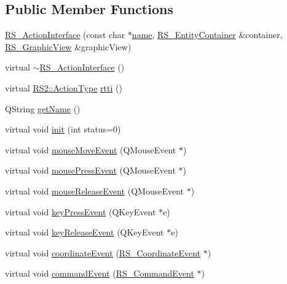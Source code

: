 \subsection*{Public Member Functions}
\begin{DoxyCompactItemize}
\item 
\hyperlink{classRS__ActionInterface_ac6be77152e154e4d39f935c89734a823}{R\-S\-\_\-\-Action\-Interface} (const char $\ast$\hyperlink{classRS__ActionInterface_a1fdccfa2fcee3e1d21e6f79e6987f3df}{name}, \hyperlink{classRS__EntityContainer}{R\-S\-\_\-\-Entity\-Container} \&container, \hyperlink{classRS__GraphicView}{R\-S\-\_\-\-Graphic\-View} \&graphic\-View)
\item 
virtual \hyperlink{classRS__ActionInterface_ab7bbb74cca442b42905fcfd956f8aecb}{$\sim$\-R\-S\-\_\-\-Action\-Interface} ()
\item 
virtual \hyperlink{classRS2_afe3523e0bc41fd637b892321cfc4b9d7}{R\-S2\-::\-Action\-Type} \hyperlink{classRS__ActionInterface_af877a66b5b4a7053f2b1f0519c57a6f5}{rtti} ()
\item 
Q\-String \hyperlink{classRS__ActionInterface_a5ee1c9bf9f5a4866922595da25356c05}{get\-Name} ()
\item 
virtual void \hyperlink{classRS__ActionInterface_a05b7dca5deeb371eb51edcb73facd45f}{init} (int status=0)
\item 
virtual void \hyperlink{classRS__ActionInterface_aa572523d745621231b7512f9960b5d8e}{mouse\-Move\-Event} (Q\-Mouse\-Event $\ast$)
\item 
virtual void \hyperlink{classRS__ActionInterface_a323ab454694976656f426eb6cc7f456c}{mouse\-Press\-Event} (Q\-Mouse\-Event $\ast$)
\item 
virtual void \hyperlink{classRS__ActionInterface_acb1f52ac33be936c4d15ef8ec95f0fe0}{mouse\-Release\-Event} (Q\-Mouse\-Event $\ast$)
\item 
virtual void \hyperlink{classRS__ActionInterface_ac95b65c310b028a96125ada37e62eb36}{key\-Press\-Event} (Q\-Key\-Event $\ast$e)
\item 
virtual void \hyperlink{classRS__ActionInterface_ad8e2085be7cde82f12c6145824956e81}{key\-Release\-Event} (Q\-Key\-Event $\ast$e)
\item 
virtual void \hyperlink{classRS__ActionInterface_a9013e88769edd39b2a74af5add2986c9}{coordinate\-Event} (\hyperlink{classRS__CoordinateEvent}{R\-S\-\_\-\-Coordinate\-Event} $\ast$)
\item 
virtual void \hyperlink{classRS__ActionInterface_a187365514bab9b2997c5fe7ff5274a22}{command\-Event} (\hyperlink{classRS__CommandEvent}{R\-S\-\_\-\-Command\-Event} $\ast$)

\end{DoxyCompactItemize}
